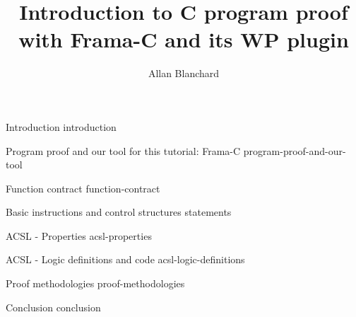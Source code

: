 \documentclass[middle]{zmdocument}
\title{Introduction to C program proof with Frama-C and its WP plugin}
\author{Allan Blanchard}
\begin{document}
\maketitle
\tableofcontents

\begin{levelOne}
  {Introduction}
  {introduction}
\end{levelOne}

\begin{levelOne}
  {Program proof and our tool for this tutorial: Frama-C}
  {program-proof-and-our-tool}
\end{levelOne}

\begin{levelOne}
  {Function contract}
  {function-contract}
\end{levelOne}

\begin{levelOne}
  {Basic instructions and control structures}
  {statements}
\end{levelOne}

\begin{levelOne}
  {ACSL - Properties}
  {acsl-properties}
\end{levelOne}

\begin{levelOne}
  {ACSL - Logic definitions and code}
  {acsl-logic-definitions}
\end{levelOne}

\begin{levelOne}
  {Proof methodologies}
  {proof-methodologies}
\end{levelOne}

\begin{levelOne}
  {Conclusion}
  {conclusion}
\end{levelOne}
\end{document}
